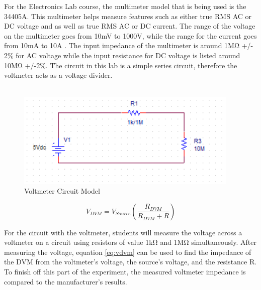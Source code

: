 For the Electronics Lab course, the multimeter model that is being used is the 34405A. This multimeter helps measure features such as either true RMS AC or DC voltage and as well as true RMS AC or DC current. The range of the voltage on the multimeter goes from 10mV to 1000V, while the range for the current goes from 10mA to 10A \cite{34405A:3}. The input impedance of the multimeter is around 1M\si{\ohm} +/- 2\% for AC voltage while the input resistance for DC voltage is listed around 10M\si{\ohm} +/-2\%\cite{34405A:6}. The circuit in this lab is a simple series circuit, therefore the voltmeter acts as a voltage divider.\\
\\

\begin{figure}[h!]
\centering
\includegraphics{voltmeterfinal.PNG}
\caption{Voltmeter Circuit Model}
\label{fig:Voltmeter_Pic}
\end{figure}

\begin{equation}
	\label{eq:vdvm}
	V_{DVM} = V_{Source}(\frac{R_{DVM}}{R_{DVM} + R}) 
\end{equation}

For the circuit with the voltmeter, students will measure the voltage across a voltmeter on a circuit using resistors of value 1kΩ and 1MΩ simultaneously. After measuring the voltage, equation \ref{eq:vdvm} can be used to find the impedance of the DVM from the voltmeter's voltage, the source's voltage, and the resistance R. To finish off this part of the experiment, the measured voltmeter impedance is compared to the manufacturer's results. 
